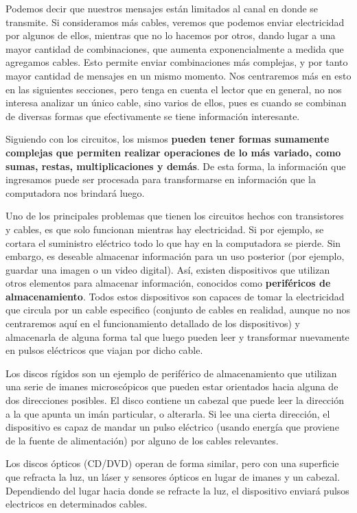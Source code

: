 Podemos decir que nuestros mensajes están limitados al canal en donde se transmite.
Si consideramos más cables, veremos que podemos enviar electricidad por algunos
de ellos, mientras que no lo hacemos por otros, dando lugar a una mayor cantidad
de combinaciones, que aumenta exponencialmente a medida que agregamos cables. Esto
permite enviar combinaciones más complejas, y por tanto mayor cantidad de mensajes
en un mismo momento. Nos centraremos más en esto en las siguientes secciones, pero
tenga en cuenta el lector que en general, no nos interesa analizar un único cable,
sino varios de ellos, pues es cuando se combinan de diversas formas que efectivamente
se tiene información interesante. 

Siguiendo con los circuitos, los mismos \textbf{pueden tener formas sumamente
complejas que permiten realizar operaciones de lo más variado, como sumas,
restas, multiplicaciones y demás}. De esta forma, la información que ingresamos
puede ser procesada para transformarse en información que la computadora nos
brindará luego.\autocite[cap. 1]{nisan_2005}

Uno de los principales problemas que tienen los circuitos hechos con transistores
y cables, es que solo funcionan mientras hay electricidad. Si por ejemplo, se
cortara el suministro eléctrico todo lo que hay en la computadora se pierde.
Sin embargo, es deseable almacenar información para un uso posterior (por
ejemplo, guardar una imagen o un video digital). Así, existen dispositivos que
utilizan otros elementos para almacenar información, conocidos como
\textbf{periféricos de almacenamiento}. Todos estos dispositivos son capaces
de tomar la electricidad que circula por un cable especifico (conjunto de cables
en realidad, aunque no nos centraremos aquí en el funcionamiento detallado de
los dispositivos) y almacenarla de alguna forma tal que luego pueden leer y
transformar nuevamente en pulsos eléctricos que viajan por dicho cable.

Los discos rígidos son un ejemplo de periférico de almacenamiento que utilizan
una serie de imanes microscópicos que pueden estar orientados hacia alguna de
dos direcciones posibles. El disco contiene un cabezal que puede leer la
dirección a la que apunta un imán particular, o alterarla. Si lee una cierta
dirección, el dispositivo es capaz de mandar un pulso eléctrico (usando energía
que proviene de la fuente de alimentación) por alguno de los cables relevantes.

Los discos ópticos (CD/DVD) operan de forma similar, pero con una superficie
que refracta la luz, un láser y sensores ópticos en lugar de imanes y un
cabezal. Dependiendo del lugar hacia donde se refracte la luz, el dispositivo
enviará pulsos electricos en determinados cables.

